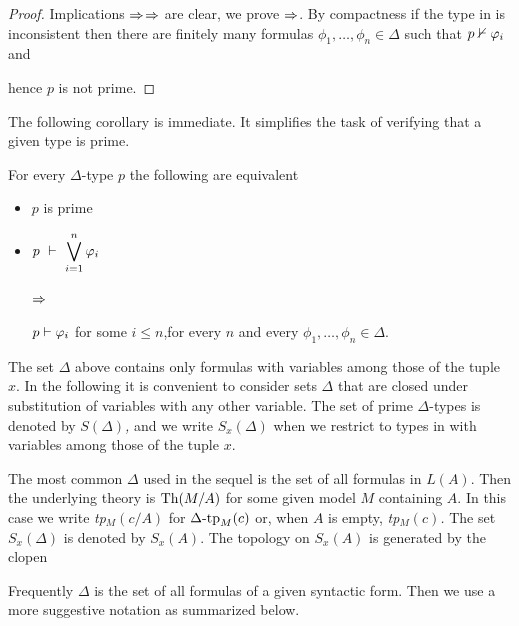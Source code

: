 \begin{proof}
Implications $\Rightarrow$$\Rightarrow$ are clear, we prove $\Rightarrow$.
By compactness if the type in  is inconsistent then there are finitely many formulas $\phi_1,\dots,\phi_n\in\Delta$ such that $p\nvdash\varphi_i$ and


hence $p$ is not prime.
\end{proof}

The following corollary is immediate.
It simplifies the task of verifying that a given type is prime.

\begin{corollary}\label{coroll_test_primalita}
For every $\Delta$-type $p$ the following are equivalent
\begin{itemize}
\item[1.] $p$ is prime
\item[2.] $\displaystyle p\ \proves\ \bigvee^n_{i=1}\phi_i$\parbox{6ex}{\hfil$\Rightarrow$}$p\vdash\varphi_i$ for some $i\le n$,\hfill for every $n$ and every $\phi_1,\dots,\phi_n\in\Delta$.
\end{itemize}
\end{corollary}

The set $\Delta$ above contains only formulas with variables among those of the tuple $x$.
In the following it is convenient to consider sets $\Delta$ that are closed under substitution of variables with any other variable.
The set of prime $\Delta$-types is denoted by \emph{$S(\Delta)$,} and we write \emph{$S_x(\Delta)$\/} when we restrict to types in with variables among those of the tuple $x$.

The most common $\Delta$ used in the sequel is the set of all formulas in $L(A)$.
Then the underlying theory is ${\rm Th}(M/A)$ for some given model $M$ containing $A$.
In this case we write \emph{tp$_M(c/A)$} for $\Delta\mbox{\rm -tp}_M(c)$ or, when $A$ is empty, \emph{tp$_M(c)$.}
The set $S_x(\Delta)$ is denoted by $S_x(A)$.
The topology on  $S_x(A)$ is generated by the clopen


Frequently $\Delta$ is the set of all formulas of a given syntactic form.
Then we use a more suggestive notation as summarized below.


